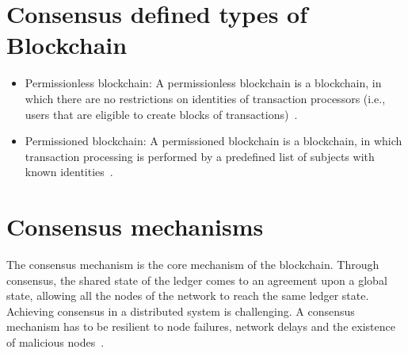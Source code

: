 \section{Consensus defined types of Blockchain}\label{bltech:consensus_blockchain_types}

\begin{itemize}
  \item Permissionless blockchain: A permissionless blockchain is a blockchain, in which there are no restrictions on identities of transaction processors (i.e., users that are eligible to create blocks of transactions)~\cite{prbc_vs_pubbc}.
  \item Permissioned blockchain: A permissioned blockchain is a blockchain, in which transaction processing is performed by a predefined list of subjects with known identities~\cite{prbc_vs_pubbc}.
\end{itemize}

\begin{table}[]
  \centering
  \caption{Blockchain Types. Source~\cite{hub-bl-types}}
  \label{table:blockchain_types}
\end{table}

\section{Consensus mechanisms}\label{bltech:consensus_mechanisms}

The consensus mechanism is the core mechanism of the blockchain. Through consensus, the shared state of the ledger comes to an agreement upon a global state,
allowing all the nodes of the network to reach the same ledger state. Achieving consensus in a distributed system is challenging.
A consensus mechanism has to be resilient to node failures, network delays and the existence of malicious nodes~\cite{wiki:byzantine_fault_tolerance}.


